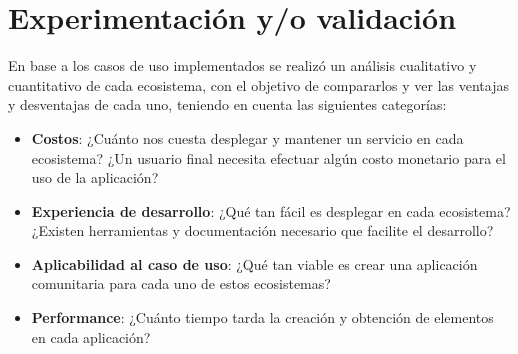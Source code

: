 \section{Experimentación y/o validación}

En base a los casos de uso implementados se realizó un análisis cualitativo y cuantitativo de cada ecosistema, con el objetivo de compararlos y ver las ventajas y desventajas de cada uno, teniendo en cuenta las siguientes categorías:

\begin{itemize}
    \item \textbf{Costos}: ¿Cuánto nos cuesta desplegar y mantener un servicio en cada ecosistema? ¿Un usuario final necesita efectuar algún costo monetario para el uso de la aplicación?
    \item \textbf{Experiencia de desarrollo}: ¿Qué tan fácil es desplegar en cada ecosistema? ¿Existen herramientas y documentación necesario que facilite el desarrollo?
    \item \textbf{Aplicabilidad al caso de uso}: ¿Qué tan viable es crear una aplicación comunitaria para cada uno de estos ecosistemas?
    \item \textbf{Performance}: ¿Cuánto tiempo tarda la creación y obtención de elementos en cada aplicación?
\end{itemize}




